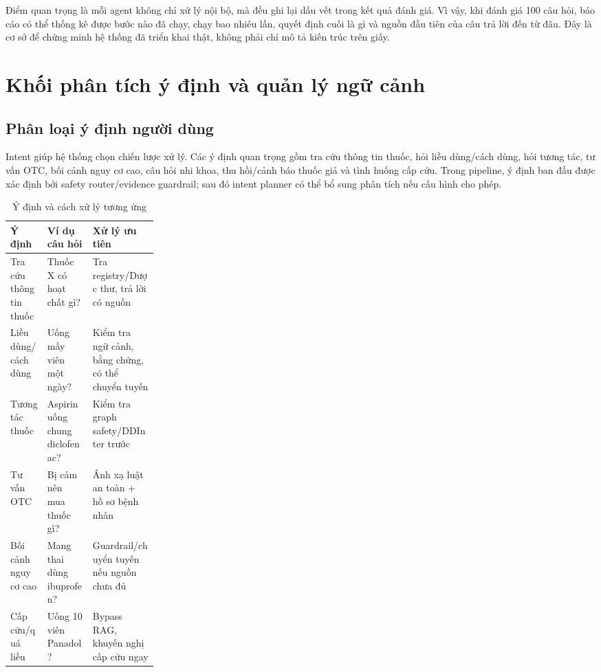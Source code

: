 Điểm quan trọng là mỗi agent không chỉ xử lý nội bộ, mà đều ghi lại dấu vết trong kết quả đánh giá. Vì vậy, khi đánh giá 100 câu hỏi, báo cáo có thể thống kê được bước nào đã chạy, chạy bao nhiêu lần, quyết định cuối là gì và nguồn đầu tiên của câu trả lời đến từ đâu. Đây là cơ sở để chứng minh hệ thống đã triển khai thật, không phải chỉ mô tả kiến trúc trên giấy.

\section{Khối phân tích ý định và quản lý ngữ cảnh}

\subsection{Phân loại ý định người dùng}

Intent giúp hệ thống chọn chiến lược xử lý. Các ý định quan trọng gồm tra cứu thông tin thuốc, hỏi liều dùng/cách dùng, hỏi tương tác, tư vấn OTC, bối cảnh nguy cơ cao, câu hỏi nhi khoa, thu hồi/cảnh báo thuốc giả và tình huống cấp cứu. Trong pipeline, ý định ban đầu được xác định bởi safety router/evidence guardrail; sau đó intent planner có thể bổ sung phân tích nếu cấu hình cho phép.

\begin{table}[H]
\centering
\small
\caption{Ý định và cách xử lý tương ứng}
\begin{tabularx}{\linewidth}{p{0.25\linewidth} Y Y}
\toprule
\textbf{Ý định} & \textbf{Ví dụ câu hỏi} & \textbf{Xử lý ưu tiên} \\
\midrule
Tra cứu thông tin thuốc & Thuốc X có hoạt chất gì? & Tra registry/Dược thư, trả lời có nguồn \\
Liều dùng/cách dùng & Uống mấy viên một ngày? & Kiểm tra ngữ cảnh, bằng chứng, có thể chuyển tuyến \\
Tương tác thuốc & Aspirin uống chung diclofenac? & Kiểm tra graph safety/DDInter trước \\
Tư vấn OTC & Bị cảm nên mua thuốc gì? & Ánh xạ luật an toàn + hồ sơ bệnh nhân \\
Bối cảnh nguy cơ cao & Mang thai dùng ibuprofen? & Guardrail/chuyển tuyến nếu nguồn chưa đủ \\
Cấp cứu/quá liều & Uống 10 viên Panadol? & Bypass RAG, khuyến nghị cấp cứu ngay \\
\bottomrule
\end{tabularx}
\end{table}

